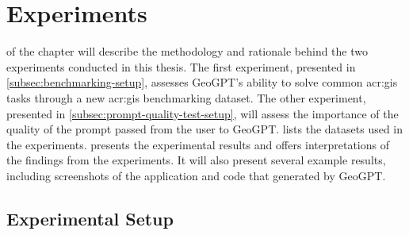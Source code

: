 \chapter{Experiments}
\label{cha:experiments}

 of the  chapter will describe the methodology and rationale behind the two experiments conducted in this thesis. The first experiment, presented in \autoref{subsec:benchmarking-setup}, assesses GeoGPT's ability to solve common \acrshort{acr:gis} tasks through a new \acrshort{acr:gis} benchmarking dataset. The other experiment, presented in \autoref{subsec:prompt-quality-test-setup}, will assess the importance of the quality of the prompt passed from the user to GeoGPT.  lists the datasets used in the experiments.  presents the experimental results and offers interpretations of the findings from the experiments. It will also present several example results, including screenshots of the application and code that generated by GeoGPT.

\section{Experimental Setup}
\label{sec:experimental-setup}

\begin{comment}
Trying and failing is a major part of research. However, to have a chance of success you need a plan driving the experimental research, just as you need a plan for your literature search. Further, plans are made to be revised and this revision ensures that any further decisions made are in line with the work already completed.

The plan should include what experiments or series of experiments are planned and what questions the individual or set of experiments aim to answer. Such questions should be connected to your research questions, so that in the evaluation of your results you can discuss the results wrt to the research questions.
\end{comment}

\begin{comment}
The experimental setup should include all data --- parameters, etc. --- that would allow a person to repeat your experiments.
This will thus be the actual instantiation for each experiment of the general architecture described in Chapter~\ref{cha:architecture}.
\end{comment}

